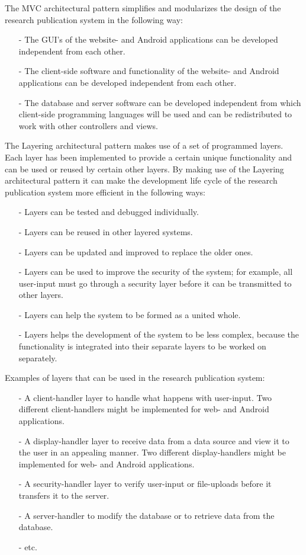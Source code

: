 \documentclass[a4paper,12pt]{article}
\begin{document}
	The MVC architectural pattern simplifies and modularizes the design of the research
	publication system in the following way:
	\begin{itemize}
		\item[-] The GUI's of the website- and Android applications can be developed
	  	independent from each other.
	  	\item[-] The client-side software and functionality of the website- and Android
	  	applications can be developed independent from each other.
	  	\item[-] The database and server software can be developed independent from which
	  	client-side programming languages will be used and can be redistributed
	  	to work with other controllers and views.
	\end{itemize}
	The Layering architectural pattern makes use of a set of programmed layers. Each
	layer has been implemented to provide a certain unique functionality and can be used or
	reused by certain other layers.
	By making use of the Layering architectural pattern it can make the development
	life cycle of the research publication system more efficient in the following ways:
	\begin{itemize}
		\item[-] Layers can be tested and debugged individually.
	  	\item[-] Layers can be reused in other layered systems.
	  	\item[-] Layers can be updated and improved to replace the older ones.
	  	\item[-] Layers can be used to improve the security of the system; for example,
	  	all user-input must go through a security layer before it can be transmitted
	  	to other layers.
	  	\item[-] Layers can help the system to be formed as a united whole.
	  	\item[-] Layers helps the development of the system to be less complex, because
	  	the functionality is integrated into their separate layers to be worked on separately.
	\end{itemize}
	Examples of layers that can be used in the research publication system:
	\begin{itemize}
		\item[-] A client-handler layer to handle what happens with user-input. Two different
	  	client-handlers might be implemented for web- and Android applications.
		\item[-] A display-handler layer to receive data from a data source and view it to the 	        user in an appealing manner. Two different display-handlers might be implemented for
	  	web- and Android applications.
		\item[-] A security-handler layer to verify user-input or file-uploads before it
	  	transfers it to the server.
		\item[-] A server-handler to modify the database or to retrieve data from the
	  	database.
		\item[-] etc.
	\end{itemize}
\end{document}
